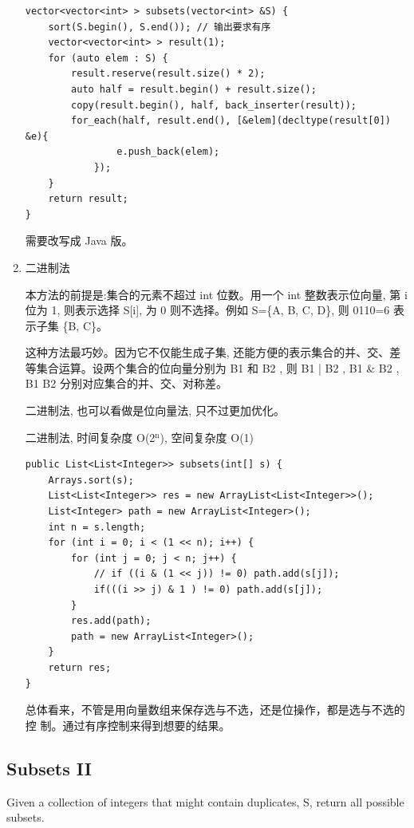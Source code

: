 \documentclass[12pt]{book}
\begin{document}
\begin{enumerate}
\lstset{language=java,label= ,caption= ,numbers=none}
\begin{lstlisting}
vector<vector<int> > subsets(vector<int> &S) {
    sort(S.begin(), S.end()); // 输出要求有序
    vector<vector<int> > result(1);
    for (auto elem : S) {
        result.reserve(result.size() * 2);
        auto half = result.begin() + result.size();
        copy(result.begin(), half, back_inserter(result));
        for_each(half, result.end(), [&elem](decltype(result[0]) &e){
                e.push_back(elem);
            });
    }
    return result;
}
\end{lstlisting}

需要改写成 Java 版。

\item 二进制法
\label{sec-9-1-1-4}

本方法的前提是:集合的元素不超过 int 位数。用一个 int 整数表示位向量, 第 i 位为 1, 则表示选择 S[i], 为 0 则不选择。例如 S=\{A, B, C, D\}, 则 0110=6 表示子集 \{B, C\}。

这种方法最巧妙。因为它不仅能生成子集, 还能方便的表示集合的并、交、差等集合运算。设两个集合的位向量分别为 B1 和 B2 , 则 B1 | B2 ,  B1 \& B2 ,  B1 B2 分别对应集合的并、交、对称差。

二进制法, 也可以看做是位向量法, 只不过更加优化。

二进制法, 时间复杂度 O(2$^{\text{n}}$), 空间复杂度 O(1)

\lstset{language=java,label= ,caption= ,numbers=none}
\begin{lstlisting}
public List<List<Integer>> subsets(int[] s) {
    Arrays.sort(s);   
    List<List<Integer>> res = new ArrayList<List<Integer>>();
    List<Integer> path = new ArrayList<Integer>();
    int n = s.length;
    for (int i = 0; i < (1 << n); i++) {
        for (int j = 0; j < n; j++) {
            // if ((i & (1 << j)) != 0) path.add(s[j]);
            if(((i >> j) & 1 ) != 0) path.add(s[j]);   
        }
        res.add(path);
        path = new ArrayList<Integer>();
    }
    return res;
}
\end{lstlisting}

总体看来，不管是用向量数组来保存选与不选，还是位操作，都是选与不选的控
制。通过有序控制来得到想要的结果。
\end{enumerate}

\subsection{Subsets II}
\label{sec-9-1-2}
Given a collection of integers that might contain duplicates, S, return all possible subsets.
\end{document}
